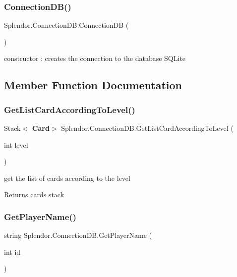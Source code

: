 \subsubsection{Connection\+D\+B()}
{\footnotesize\ttfamily Splendor.\+Connection\+D\+B.\+Connection\+DB (\begin{DoxyParamCaption}{ }\end{DoxyParamCaption})}



constructor \+: creates the connection to the database S\+Q\+Lite 



\subsection{Member Function Documentation}
\mbox{\label{class_splendor_1_1_connection_d_b_abcd995d0fa97aa5f3a40ff5c23b22502}} 
\subsubsection{Get\+List\+Card\+According\+To\+Level()}
{\footnotesize\ttfamily Stack$<$\textbf{ Card}$>$ Splendor.\+Connection\+D\+B.\+Get\+List\+Card\+According\+To\+Level (\begin{DoxyParamCaption}\item[{int}]{level }\end{DoxyParamCaption})}



get the list of cards according to the level 

\begin{DoxyReturn}{Returns}
cards stack
\end{DoxyReturn}
\mbox{\label{class_splendor_1_1_connection_d_b_a7d715d5452049ad06f4a407fa5df151c}} 
\subsubsection{Get\+Player\+Name()}
{\footnotesize\ttfamily string Splendor.\+Connection\+D\+B.\+Get\+Player\+Name (\begin{DoxyParamCaption}\item[{int}]{id }\end{DoxyParamCaption})}



